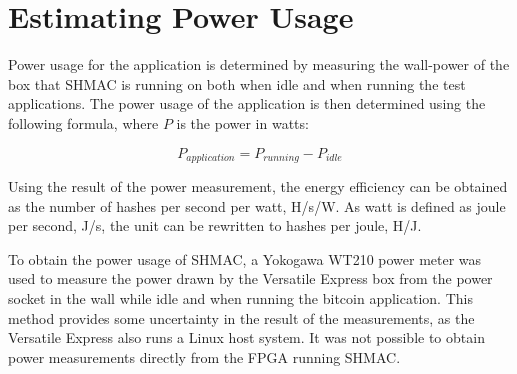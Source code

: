 \section{Estimating Power Usage}
\label{sec:power-measure}

Power usage for the application is determined by measuring the wall-power of the box
that SHMAC is running on both when idle and when running the test applications. The
power usage of the application is then determined using the following formula, where
$P$ is the power in watts:

\[P_{application} = P_{running} - P_{idle}\]

Using the result of the power measurement, the energy efficiency can be obtained as
the number of hashes per second per watt, H/s/W. As watt is defined as joule per second,
J/s, the unit can be rewritten to hashes per joule, H/J.

To obtain the power usage of SHMAC, a Yokogawa WT210 power meter was used to measure
the power drawn by the Versatile Express box from the power socket in the wall while
idle and when running the bitcoin application. This method provides some uncertainty
in the result of the measurements, as the Versatile Express also runs a Linux host
system. It was not possible to obtain power measurements directly from the FPGA running
SHMAC. %

%
%
%
%
%

